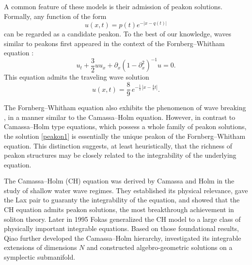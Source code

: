 \documentclass[11pt]{article}
\begin{document}
A common feature of these models is their admission of peakon solutions. Formally, any function of the form 
\begin{equation*}
u(x,t) = p(t)e^{-|x-q(t)|}
\end{equation*}
can be regarded as a candidate peakon. To the best of our knowledge, waves similar to peakons first appeared in the context of the Fornberg--Whitham equation \cite{fornberg1978numerical}:
\begin{equation}
u_t + \frac{3}{2}u u_x + \partial_x (1-\partial_x^2)^{-1} u = 0.
\end{equation}
This equation admits the traveling wave solution
\begin{equation}
u(x,t) = \frac{8}{9} \, e^{-\frac{1}{2} \, |x - \frac{4}{3} t|}.
\label{peakon1}
\end{equation}

The Fornberg--Whitham equation also exhibits the phenomenon of wave breaking \cite{haziot2017wave}, in a manner similar to the Camassa--Holm equation. However, in contrast to Camassa--Holm type equations, which possess a whole family of peakon solutions, the solution \eqref{peakon1} is essentially the unique peakon of the Fornberg--Whitham equation. This distinction suggests, at least heuristically, that the richness of peakon structures may be closely related to the integrability of the underlying equation.

The Camassa–Holm (CH) equation \cite{camassa1993integrable} was derived by Camassa and Holm in the study of shallow water wave regimes. They established its physical relevance, gave the Lax pair to guaranty the integrability of the equation, and showed that the CH equation admits peakon solutions, the most breakthrough achievement in soliton theory. Later in 1995 Fokas \cite{fokas1995physicad} generalized the CH model to a large class of physically important integrable equations.    
Based on those foundational results, Qiao \cite{qiao2003camassa} further developed the Camassa--Holm hierarchy, investigated its integrable extensions of dimensions $N$ and constructed algebro-geometric solutions on a symplectic submanifold.
\end{document}
